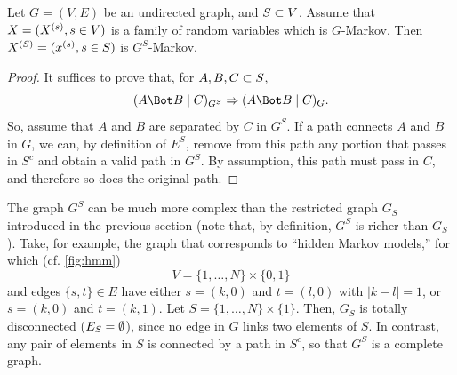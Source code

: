 \begin{proposition}
\label{prop:margin}
Let $G = (V, E)$ be an undirected graph, and $S\subset V$. Assume that
$X = (X^{(s)}, s\in V) $ is a family of random variables which is 
$G$-Markov. Then $X^{(S)} = (x^{(s)}, s\in S)$ is $G^S$-Markov.
\end{proposition}
\begin{proof}
It suffices to prove that, for $A,B,C\subset S$,
\[
\cind{A}{B}{C}_{G^S} \Ria \cind{A}{B}{C}_G.
\]
So, assume that $A$ and $B$ are
separated by $C$ in $G^S$. If a path connects $A$ and $B$ in
$G$, we can, by definition of $E^S$, remove from this path any portion
that passes in $S^c$ and obtain a valid path in $G^S$. By assumption,
this path must pass in $C$, and therefore so does the original path.
\end{proof}

The graph $G^S$ can be much more complex than the restricted graph
$G_S$ introduced in the previous section (note that, by definition,
$G^S$ is richer than $G_S$). Take, for example, the graph that
corresponds to ``hidden Markov models,'' for which (cf. \cref{fig:hmm})
\[
V = \{1, \ldots, N\} \times \{0,1\}
\]
and edges $\{s,t\}\in E$ have either $s=(k,0)$ and $t=(l,0)$ with
$|k-l|=1$, or $s = (k,0)$ and $t=(k,1)$. Let $S = \{1, \ldots,
N\}\times\{1\}$. Then, $G_S$ is totally disconnected ($E_S= \emptyset$),
since no edge in $G$ links two elements of $S$. In contrast, any pair
of elements in $S$ is connected by a path in $S^c$, so that $G^S$ is a
complete graph.  

